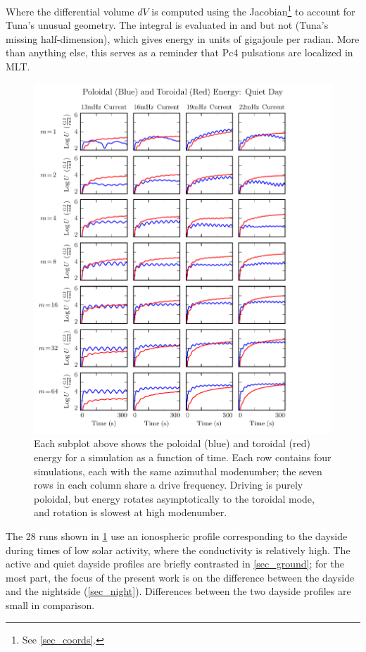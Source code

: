 Where the differential volume $dV$ is computed using the Jacobian\footnote{See \cref{sec_coords}. } to account for Tuna's unusual geometry. The integral is evaluated in \lysakx and \lysakz but not \lysaky (Tuna's missing half-dimension), which gives energy in units of gigajoule per radian. More than anything else, this serves as a reminder that Pc4 pulsations are localized in MLT. 

\begin{figure}[!htb]
    \centering
    \includegraphics[width=\textwidth]{figures/U_day.pdf}
    \caption[Dayside Poloidal and Toroidal Energy]{
      Each subplot above shows the poloidal (blue) and toroidal (red) energy for a simulation as a function of time. Each row contains four simulations, each with the same azimuthal modenumber; the seven rows in each column share a drive frequency. Driving is purely poloidal, but energy rotates asymptotically to the toroidal mode, and rotation is slowest at high modenumber. 
    }
    \label{fig_U_day}
\end{figure}

The 28 runs shown in \cref{fig_U_day} use an ionospheric profile corresponding to the dayside during times of low solar activity, where the conductivity is relatively high. The active and quiet dayside profiles are briefly contrasted in \cref{sec_ground}; for the most part, the focus of the present work is on the difference between the dayside and the nightside (\cref{sec_night}). Differences between the two dayside profiles are small in comparison. 

